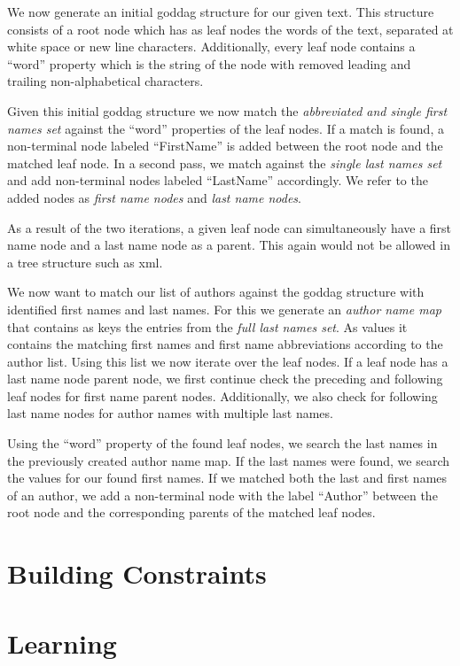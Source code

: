 We now generate an initial \gls{goddag} structure for our given text.
This structure consists of a root node which has as leaf nodes the words of the text, separated at white space or new line characters.
Additionally, every leaf node contains a ``word'' property which is the string of the node with removed leading and trailing non-alphabetical characters.

Given this initial \gls{goddag} structure we now match the \textit{abbreviated and single first names set} against the ``word'' properties of the leaf nodes.
If a match is found, a non-terminal node labeled ``FirstName'' is added between the root node and the matched leaf node.
In a second pass, we match against the \textit{single last names set} and add non-terminal nodes labeled ``LastName'' accordingly.
We refer to the added nodes as \textit{first name nodes} and \textit{last name nodes}.

As a result of the two iterations, a given leaf node can simultaneously have a first name node and a last name node as a parent.
This again would not be allowed in a tree structure such as \gls{xml}.

We now want to match our list of authors against the \gls{goddag} structure with identified first names and last names.
For this we generate an \textit{author name map} that contains as keys the entries from the \textit{full last names set}.
As values it contains the matching first names and first name abbreviations according to the author list.
Using this list we now iterate over the leaf nodes.
If a leaf node has a last name node parent node, we first continue check the preceding and following leaf nodes for first name parent nodes.
Additionally, we also check for following last name nodes for author names with multiple last names.

Using the ``word'' property of the found leaf nodes, we search the last names in the previously created author name map.
If the last names were found, we search the values for our found first names.
If we matched both the last and first names of an author, we add a non-terminal node with the label ``Author'' between the root node and the corresponding parents of the matched leaf nodes.




\section{Building  Constraints}\label{sec:ae-training-crfs}

\section{Learning }\label{sec:ae-training-crfs}

